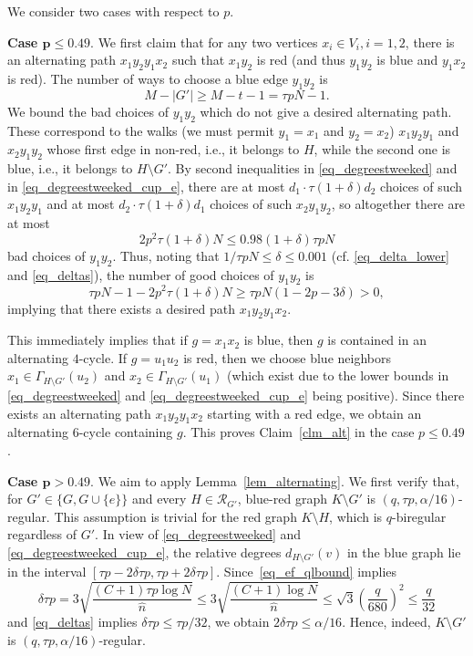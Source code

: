 \documentclass[12pt,reqno]{amsart}
\newcommand{\rc}{{\mathcal{R}}}
\theoremstyle{definition}
\begin{document}
We consider two cases with respect to $p$.

\medskip

 {\bf Case  $\mathbf{p \le 0.49}$}.
 We first claim that for any two vertices $x_i \in V_i, i = 1,2$, there is an alternating path $x_1y_2y_1x_2$ such that $x_1y_2$ is red (and thus $y_1y_2$ is blue and $y_1x_2$ is red).
 The number of ways to choose a blue edge $y_1y_2$ is
 \[
   M - |G'| \ge M - t - 1 = \tau pN - 1.
 \]
 We bound the bad choices of $y_1y_2$ which do not give a desired alternating path. These correspond to the walks (we must permit $y_1 = x_1$ and $y_2 = x_2$) $x_1y_2y_1$ and $x_2y_1y_2$ whose first edge in non-red, i.e., it belongs to $H$,  while the second one is blue, i.e., it belongs to $H\setminus G'$. By second inequalities in \eqref{eq_degreestweeked} and in \eqref{eq_degreestweeked_cup_e}, there are  at most $d_1 \cdot\tau(1 + \delta)d_2$ choices of such $x_1y_2y_1$ and at most $d_2 \cdot \tau(1 + \delta)d_1$ choices of such $x_2y_1y_2$, so altogether there are at most
 \[
   2p^2\tau(1 + \delta)N \le 0.98(1 + \delta) \tau p N
 \]
 bad choices of $y_1y_2$.
 Thus, noting that $1/\tau p N \le \delta\le 0.001$ (cf. \eqref{eq_delta_lower} and \eqref{eq_deltas}), the number of good choices of $y_1y_2$ is
\begin{equation*}
  \tau pN - 1 - 2p^2\tau(1 + \delta)N \ge \tau p N ( 1 - 2 p - 3\delta) > 0,
\end{equation*}
implying that there exists a desired path $x_1y_2y_1x_2$.

This immediately implies that if $g = x_1x_2$ is blue, then $g$ is contained in an alternating $4$-cycle. If $g = u_1u_2$ is red, then we choose blue neighbors $x_1 \in \Gamma_{H\setminus G'}(u_2)$ and $x_2 \in \Gamma_{H \setminus G'}(u_1)$ (which exist due to the lower bounds in \eqref{eq_degreestweeked} and \eqref{eq_degreestweeked_cup_e} being positive). Since there exists an alternating path $x_1y_2y_1x_2$ starting with a red edge, we obtain an alternating $6$-cycle containing $g$.
	This proves Claim~\ref{clm_alt} in the case $p \le 0.49$.





\medskip

{\bf Case  $\mathbf{p > 0.49}$}.
We aim to apply Lemma~\ref{lem_alternating}.
We first verify that, for $G'\in\{G, G\cup\{e\}\}$ and every $H\in\rc_{G'}$, blue-red graph $K\setminus G'$ is $(q, \tau p, \alpha/16)$-regular.
This assumption is trivial for the red graph $K\setminus H$, which is $q$-biregular regardless of $G'$.
 In view of \eqref{eq_degreestweeked} and \eqref{eq_degreestweeked_cup_e}, the relative degrees $d_{H\setminus G'}(v)$ in the blue graph lie in the interval $[\tau p - 2\delta \tau p, \tau p + 2\delta \tau p]$. Since~\eqref{eq_ef_qlbound} implies
 \[
	 \delta\tau p = 3\sqrt{\frac{(C+1)\tau p \log N }{\hat n}} \le 3\sqrt{\frac{(C+1)\log N }{ \hat n}} \le \sqrt3\left(\frac q{680}\right)^2 \le \frac q{32}
 \]
 and \eqref{eq_deltas} implies $\delta \tau p  \le \tau p / 32$, we obtain $2 \delta \tau p \le \alpha/16$. Hence, indeed, $K\setminus G'$ is $(q, \tau p, \alpha/16)$-regular.
\end{document}
